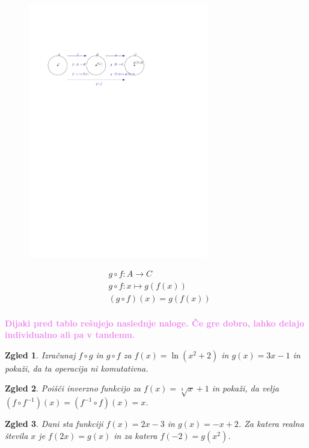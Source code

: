 \documentclass{article}
\newtheorem*{zgled}{Zgled}
\begin{document}
\begin{figure}[H]
    \includegraphics[width=0.7\textwidth]{kompozitum.pdf}
    \centering
\end{figure}

\begin{align*}
    & g\circ f: A\rightarrow C\\
    & g\circ f: x\mapsto g(f(x))\\
    & (g\circ f)(x)=g(f(x))\\
\end{align*}

\textbf{\textcolor{violet}{Dijaki pred tablo rešujejo naslednje naloge. Če gre dobro, lahko delajo individualno ali pa v tandemu.}}

\begin{zgled}
    Izračunaj $f\circ g$ in $g\circ f$ za $f(x)=\ln (x^2+2)$ in $g(x)=3x-1$ in pokaži, da ta operacija ni komutativna.
\end{zgled}

\begin{zgled}
    Poišči inverzno funkcijo za $f(x)=\sqrt[3]{x}+1$ in pokaži, da velja $(f\circ f^{-1})(x)=(f^{-1}\circ f)(x)=x$.
\end{zgled}
   
\begin{zgled}
    Dani sta funkciji $f(x)=2x-3$ in $g(x)=-x+2$. Za katera realna števila $x$ je $f(2x)=g(x)$ in za katera $f(-2)=g(x^2)$.
\end{zgled}
\end{document}
